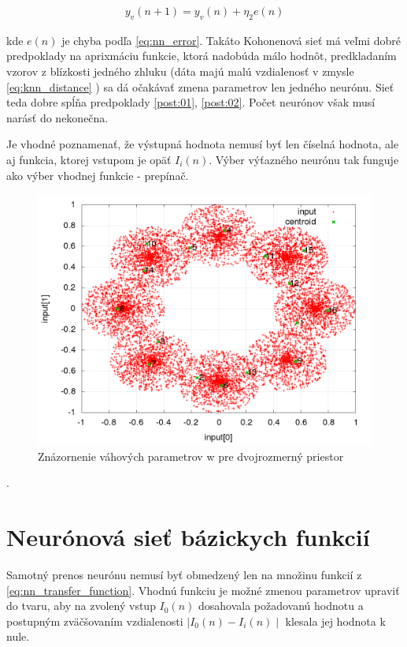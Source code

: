 \begin{align}
y_v(n+1) = y_v(n) + \eta_2 e(n)
\label{eq:knn_y_update}
\end{align}

kde $e(n)$ je chyba podľa \ref{eq:nn_error}.
Takáto Kohonenová sieť má veľmi dobré predpoklady na aprixmáciu funkcie,
ktorá nadobúda málo hodnôt, predkladaním vzorov z blízkosti
jedného zhluku (dáta majú malú vzdialenosť v zmysle \ref{eq:knn_distance} )
sa dá očakávať zmena parametrov len jedného neurónu. Sieť teda dobre spĺňa predpoklady
\ref{post:01},  \ref{post:02}. Počet neurónov však musí narásť do nekonečna.

Je vhodné poznamenať, že výstupná hodnota nemusí byť len číselná hodnota, ale aj funkcia, ktorej vstupom je opäť
$I_i(n)$. Výber výťazného neurónu tak funguje ako výber vhodnej funkcie - prepínač.

\begin{figure}[]
\center
\includegraphics[scale=.4]{../pictures/knn_learing_result.png}
\caption{Znázornenie váhových parametrov w pre dvojrozmerný priestor}
\label{img:knn_learning_result}
\end{figure}

.

\section{Neurónová sieť bázickych funkcií}

Samotný prenos neurónu nemusí byť obmedzený len na množinu funkcií z \ref{eq:nn_transfer_function}.
Vhodnú funkciu je možné zmenou parametrov upraviť do tvaru, aby na zvolený
vstup $I_0(n)$ dosahovala požadovanú hodnotu a postupným zväčšovaním
vzdialenosti $\mid I_0(n) - I_i(n) \mid$ klesala jej hodnota k nule.

